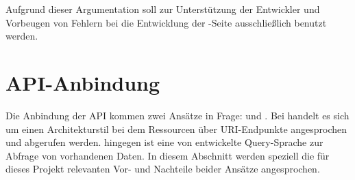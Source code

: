 Aufgrund dieser Argumentation soll zur Unterstützung der Entwickler und Vorbeugen von Fehlern bei die Entwicklung der -Seite ausschließlich  benutzt werden. 

\section{API-Anbindung}
Die Anbindung der API kommen zwei Ansätze in Frage:  und \@. Bei  handelt es sich um einen Architekturstil bei dem Ressourcen über URI-Endpunkte angesprochen und abgerufen werden.  hingegen ist eine von  entwickelte Query-Sprache zur Abfrage von vorhandenen Daten. In diesem Abschnitt werden speziell die für dieses Projekt relevanten Vor- und Nachteile beider Ansätze angesprochen.


